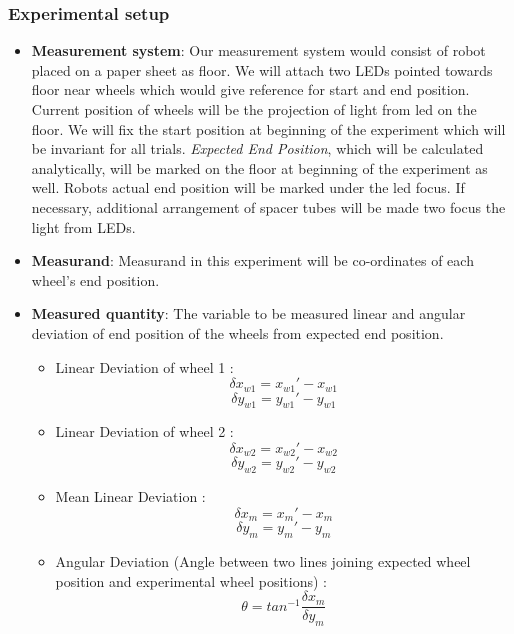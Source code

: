 \documentclass[11pt,a4paper,openright,twoside]{extreport}
\begin{document}
\subsubsection*{Experimental setup}
\begin{itemize}
\item \textbf{Measurement system}: Our measurement system would consist of robot placed on a paper sheet as floor. We will attach two LEDs pointed towards floor near wheels which would give reference for start and end position. Current position of wheels will be the projection of light from led on the floor. We will fix the start position at beginning of the experiment which will be invariant for all trials. \textit{Expected End Position}, which will be calculated analytically, will be marked on the floor at beginning of the experiment as well. Robots actual end position will be marked under the led focus. If necessary, additional arrangement of spacer tubes will be made two focus the light from LEDs. 

\item \textbf{Measurand}: Measurand in this experiment will be co-ordinates of each wheel's end position. 

\item \textbf{Measured quantity}: The variable to be measured linear and angular deviation of end position of the wheels from expected end position. 

\begin{itemize}
	\item Linear Deviation of wheel 1 : 
	$$\delta x_{w1} = x_{w1}' - x_{w1}$$
	$$\delta y_{w1} = y_{w1}' - y_{w1}$$
	\item Linear Deviation of wheel 2 : 
	$$\delta x_{w2} = x_{w2}' - x_{w2}$$
	$$\delta y_{w2} = y_{w2}' - y_{w2}$$
	\item Mean Linear Deviation :  
	$$\delta x_{m} = x_{m}' - x_{m}$$
	$$\delta y_{m} = y_{m}' - y_{m}$$
	\item Angular Deviation (Angle between two lines joining expected wheel position and experimental wheel positions) : 
	$$\theta = tan^{-1}\frac{\delta x_{m}}{\delta y_{m}}$$
	
\end{itemize}





\end{itemize}
\end{document}
